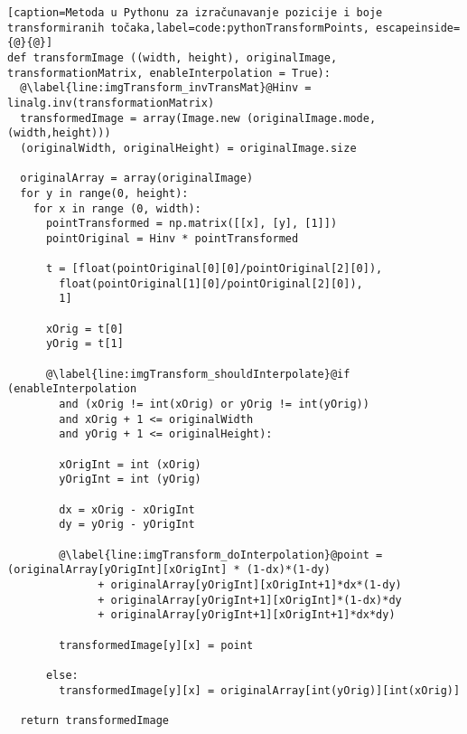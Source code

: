 \begin{lstlisting}[caption=Metoda u Pythonu za izračunavanje pozicije i boje transformiranih točaka,label=code:pythonTransformPoints, escapeinside={@}{@}]
def transformImage ((width, height), originalImage, transformationMatrix, enableInterpolation = True):
  @\label{line:imgTransform_invTransMat}@Hinv = linalg.inv(transformationMatrix)
  transformedImage = array(Image.new (originalImage.mode, (width,height)))
  (originalWidth, originalHeight) = originalImage.size

  originalArray = array(originalImage)
  for y in range(0, height):
    for x in range (0, width):
      pointTransformed = np.matrix([[x], [y], [1]])
      pointOriginal = Hinv * pointTransformed
     
      t = [float(pointOriginal[0][0]/pointOriginal[2][0]),
        float(pointOriginal[1][0]/pointOriginal[2][0]),
        1]
      
      xOrig = t[0]
      yOrig = t[1]

      @\label{line:imgTransform_shouldInterpolate}@if (enableInterpolation
        and (xOrig != int(xOrig) or yOrig != int(yOrig))
        and xOrig + 1 <= originalWidth
        and yOrig + 1 <= originalHeight):

        xOrigInt = int (xOrig)
        yOrigInt = int (yOrig)

        dx = xOrig - xOrigInt
        dy = yOrig - yOrigInt

        @\label{line:imgTransform_doInterpolation}@point = (originalArray[yOrigInt][xOrigInt] * (1-dx)*(1-dy)
              + originalArray[yOrigInt][xOrigInt+1]*dx*(1-dy)
              + originalArray[yOrigInt+1][xOrigInt]*(1-dx)*dy
              + originalArray[yOrigInt+1][xOrigInt+1]*dx*dy)

        transformedImage[y][x] = point

      else:
        transformedImage[y][x] = originalArray[int(yOrig)][int(xOrig)]

  return transformedImage
\end{lstlisting}
